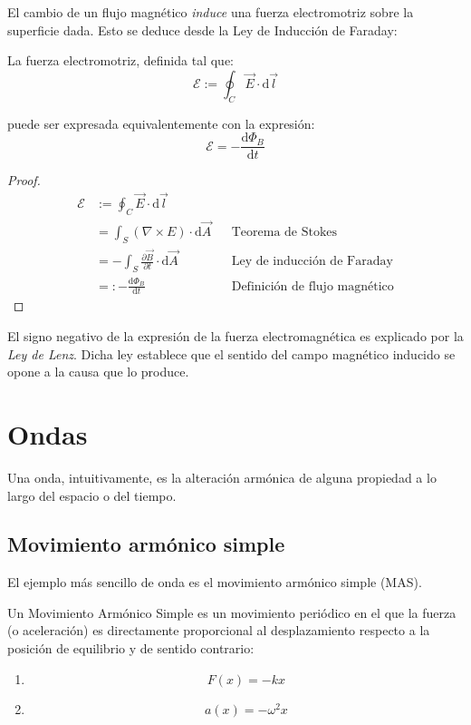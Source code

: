 \documentclass[10pt]{article}
\newcommand{\diff}{\mathrm{d}}
\begin{document}
El cambio de un flujo magnético \textit{induce} una fuerza electromotriz sobre la superficie dada. Esto se deduce desde la Ley de Inducción de Faraday:

\begin{theorem}
  La fuerza electromotriz, definida tal que:
  \[ \mathcal{E} := \oint_C \vec{E} \cdot \diff \vec{l} \]

  puede ser expresada equivalentemente con la expresión:
  \[ \mathcal{E} = - \frac{\diff \Phi_B}{\diff t} \]
\end{theorem}

\begin{proof}
  \begin{align*}
    \mathcal{E} &:= \oint_C \vec{E} \cdot \diff \vec{l} \\
                &= \int_S (\nabla \times E) \cdot \diff \vec{A} && \text{Teorema de Stokes} \\
                &= - \int_S \frac{\partial \vec{B}}{\partial t} \cdot \diff \vec{A} && \text{Ley de inducción de Faraday} \\
                &=: - \frac{\diff \Phi_B}{\diff t} && \text{Definición de flujo magnético}
  \end{align*}

\end{proof}

\begin{remark}
  El signo negativo de la expresión de la fuerza electromagnética es explicado por la \textit{Ley de Lenz}. Dicha ley establece
  que el sentido del campo magnético inducido se opone a la causa que lo produce.
\end{remark}

\section{Ondas}

Una onda, intuitivamente, es la alteración armónica de alguna propiedad a lo largo del espacio o del tiempo.

\subsection{Movimiento armónico simple}

 El ejemplo más sencillo de onda es el movimiento armónico simple (MAS).

\begin{definition}
  Un Movimiento Armónico Simple es un movimiento periódico en el que la fuerza (o aceleración) es directamente proporcional al desplazamiento respecto a la posición
  de equilibrio y de sentido contrario:
  \begin{enumerate}
    \item \[ F(x) = -kx \]
    \item \[ a (x)= -\omega^2 x \]
  \end{enumerate}
\end{definition}
\end{document}
